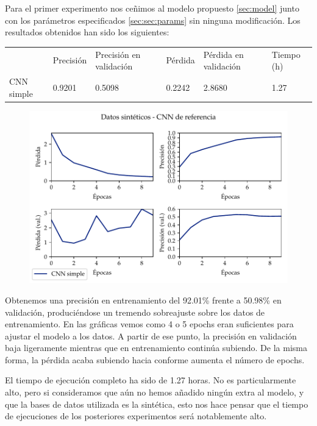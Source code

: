 \documentclass[a4paper, 20pt, dvipsnames]{article}
\begin{document}
Para el primer experimento nos ceñimos al modelo propuesto \ref{sec:model} junto con
los parámetros especificados \ref{sec:sec:params} sin ninguna modificación. Los resultados obtenidos han sido los siguientes: 

\begin{table}[H]
	\centering
	\begin{tabular}{llllll}
		& Precisión & Precisión en validación & Pérdida & Pérdida en validación & Tiempo (h) \\ \cline{2-6} 
		CNN simple & 0.9201    & 0.5098                  & 0.2242  & 2.8680                & 1.27      
	\end{tabular}
\end{table}

\begin{figure}[H]
	\centering
	\includegraphics{fig/toy-1.pdf}
\end{figure}

Obtenemos una precisión en entrenamiento del 92.01\% frente a 50.98\% en validación,
produciéndose un tremendo sobreajuste sobre los datos de entrenamiento. En las gráficas
vemos como 4 o 5 epochs eran suficientes para ajustar el modelo a los datos. A partir de
ese punto, la precisión en validación baja ligeramente mientras que en entrenamiento
continúa subiendo. De la misma forma, la pérdida acaba subiendo hacia conforme aumenta
el número de epochs.

El tiempo de ejecución completo ha sido de 1.27 horas. No es particularmente alto,
pero si consideramos que aún no hemos añadido ningún extra al modelo, y que la bases
de datos utilizada es la sintética, esto nos hace pensar que el tiempo de ejecuciones
de los posteriores experimentos será notablemente alto.
\end{document}
